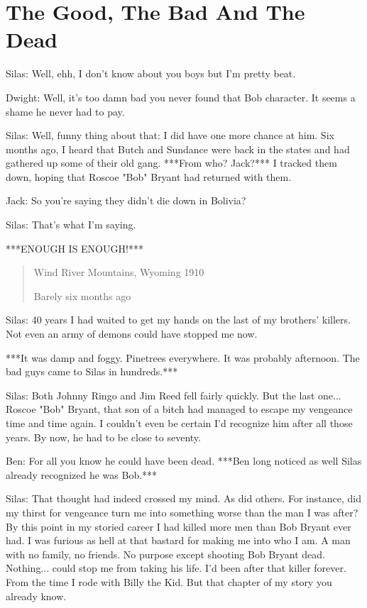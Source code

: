 \documentclass{article}
\begin{document}
\section*{The Good, The Bad And The Dead}

Silas: Well, ehh, I don't know about you boys but I'm pretty beat.

Dwight: Well, it's too damn bad you never found that Bob character. It seems a shame he never had to pay.

Silas: Well, funny thing about that: I did have one more chance at him. Six months ago, I heard that Butch and Sundance were back in the states and had gathered up some of their old gang. ***From who? Jack?*** I tracked them down, hoping that Roscoe "Bob" Bryant had returned with them.

Jack: So you're saying they didn't die down in Bolivia?

Silas: That's what I'm saying.

***ENOUGH IS ENOUGH!***

\begin{quote}
    Wind River Mountains, Wyoming 1910
    
    Barely six months ago
\end{quote}

Silas: 40 years I had waited to get my hands on the last of my brothers' killers. Not even an army of demons could have stopped me now.

***It was damp and foggy. Pinetrees everywhere. It was probably afternoon. The bad guys came to Silas in hundreds.***

Silas: Both Johnny Ringo and Jim Reed fell fairly quickly. But the last one... Roscoe "Bob" Bryant, that son of a bitch had managed to escape my vengeance time and time again. I couldn't even be certain I'd recognize him after all those years. By now, he had to be close to seventy.

Ben: For all you know he could have been dead. ***Ben long noticed as well Silas already recognized he was Bob.***

Silas: That thought had indeed crossed my mind. As did others. For instance, did my thirst for vengeance turn me into something worse than the man I was after? By this point in my storied career I had killed more men than Bob Bryant ever had. I was furious as hell at that bastard for making me into who I am. A man with no family, no friends. No purpose except shooting Bob Bryant dead. Nothing... could stop me from taking his life. I'd been after that killer forever. From the time I rode with Billy the Kid. But that chapter of my story you already know.
\end{document}

